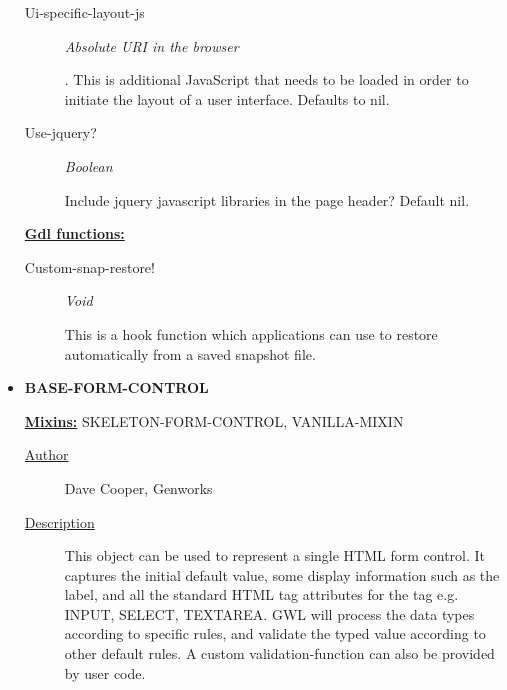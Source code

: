 \documentclass [11pt]{book}
\begin{document}
\begin{itemize}
\begin{description}
\item [Ui-specific-layout-js]
\emph{Absolute URI in the browser}

.
This is additional JavaScript that needs to be loaded in order to initiate the layout of a user
interface. Defaults to nil.




\item [Use-jquery?]
\emph{Boolean}

 Include jquery javascript libraries in the page header?
Default nil.




\end{description}






\textbf{
\underline{Gdl functions:}}

\begin{description}

\item [Custom-snap-restore!]
\emph{Void}

 This is a hook function which applications can use to restore automatically
from a saved snapshot file.




\end{description}







\item {}
\textbf{BASE-FORM-CONTROL}


\textbf{
\underline{Mixins:}} SKELETON-FORM-CONTROL, VANILLA-MIXIN





\begin{description}

\item [
\underline{Author}]


Dave Cooper, Genworks



\item [
\underline{Description}]


This object can be used to represent a single HTML form control. It captures the 
initial default value, some display information such as the label, and all the standard HTML tag attributes
for the tag e.g. INPUT, SELECT, TEXTAREA. GWL will process the data types according to specific rules,
and validate the typed value according to other default rules. A custom validation-function can also 
be provided by user code. 


\end{description}
\end{itemize}
\end{document}
